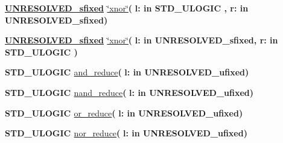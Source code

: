 \begin{DoxyCompactItemize}
\item 
{\bfseries {\bfseries {\bfseries \hyperlink{classfixed__pkg_aa723b28a027c3c0f9bca02d75e8df4d6}{U\+N\+R\+E\+S\+O\+L\+V\+E\+D\+\_\+sfixed}} \textcolor{vhdlchar}{ }}} \hyperlink{classfixed__pkg_a16897784d10609687de9257fb382cad4}{\char`\"{}xnor\char`\"{}}{\bfseries  ( }{\bfseries \textcolor{vhdlchar}{l\+: }\textcolor{stringliteral}{in }{\bfseries \textcolor{comment}{S\+T\+D\+\_\+\+U\+L\+O\+G\+I\+C}\textcolor{vhdlchar}{ }}}{\bfseries  , \textcolor{vhdlchar}{r\+: }\textcolor{stringliteral}{in }\textcolor{vhdlchar}{U\+N\+R\+E\+S\+O\+L\+V\+E\+D\+\_\+sfixed}}{\bfseries  )} 
\item 
{\bfseries {\bfseries {\bfseries \hyperlink{classfixed__pkg_aa723b28a027c3c0f9bca02d75e8df4d6}{U\+N\+R\+E\+S\+O\+L\+V\+E\+D\+\_\+sfixed}} \textcolor{vhdlchar}{ }}} \hyperlink{classfixed__pkg_a16897784d10609687de9257fb382cad4}{\char`\"{}xnor\char`\"{}}{\bfseries  ( }{\bfseries \textcolor{vhdlchar}{l\+: }\textcolor{stringliteral}{in }\textcolor{vhdlchar}{U\+N\+R\+E\+S\+O\+L\+V\+E\+D\+\_\+sfixed}}{\bfseries  , \textcolor{vhdlchar}{r\+: }\textcolor{stringliteral}{in }{\bfseries \textcolor{comment}{S\+T\+D\+\_\+\+U\+L\+O\+G\+I\+C}\textcolor{vhdlchar}{ }}}{\bfseries  )} 
\item 
{\bfseries {\bfseries \textcolor{comment}{S\+T\+D\+\_\+\+U\+L\+O\+G\+I\+C}\textcolor{vhdlchar}{ }}} \hyperlink{classfixed__pkg_ab127ad18d0e5b9a38b09dfeeb23f2809}{and\+\_\+reduce}{\bfseries  ( }{\bfseries \textcolor{vhdlchar}{l\+: }\textcolor{stringliteral}{in }\textcolor{vhdlchar}{U\+N\+R\+E\+S\+O\+L\+V\+E\+D\+\_\+ufixed}}{\bfseries  )} 
\item 
{\bfseries {\bfseries \textcolor{comment}{S\+T\+D\+\_\+\+U\+L\+O\+G\+I\+C}\textcolor{vhdlchar}{ }}} \hyperlink{classfixed__pkg_adce82fa7ec9d1f061f5d6b3dc67d583d}{nand\+\_\+reduce}{\bfseries  ( }{\bfseries \textcolor{vhdlchar}{l\+: }\textcolor{stringliteral}{in }\textcolor{vhdlchar}{U\+N\+R\+E\+S\+O\+L\+V\+E\+D\+\_\+ufixed}}{\bfseries  )} 
\item 
{\bfseries {\bfseries \textcolor{comment}{S\+T\+D\+\_\+\+U\+L\+O\+G\+I\+C}\textcolor{vhdlchar}{ }}} \hyperlink{classfixed__pkg_adee70e282d92bddd3959ca7436fdfb87}{or\+\_\+reduce}{\bfseries  ( }{\bfseries \textcolor{vhdlchar}{l\+: }\textcolor{stringliteral}{in }\textcolor{vhdlchar}{U\+N\+R\+E\+S\+O\+L\+V\+E\+D\+\_\+ufixed}}{\bfseries  )} 
\item 
{\bfseries {\bfseries \textcolor{comment}{S\+T\+D\+\_\+\+U\+L\+O\+G\+I\+C}\textcolor{vhdlchar}{ }}} \hyperlink{classfixed__pkg_a807bcfdd90aa99257feb3c93cb068e79}{nor\+\_\+reduce}{\bfseries  ( }{\bfseries \textcolor{vhdlchar}{l\+: }\textcolor{stringliteral}{in }\textcolor{vhdlchar}{U\+N\+R\+E\+S\+O\+L\+V\+E\+D\+\_\+ufixed}}{\bfseries  )} 

\end{DoxyCompactItemize}

